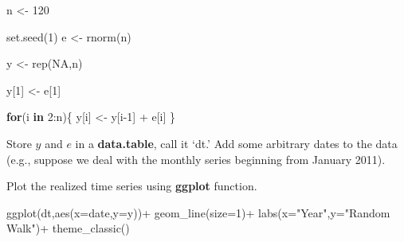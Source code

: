 \documentclass[
  12pt,
  oneside]{book}
\newenvironment{Shaded}{\begin{snugshade}}{\end{snugshade}}
\newcommand{\AttributeTok}[1]{\textcolor[rgb]{0.77,0.63,0.00}{#1}}
\newcommand{\ConstantTok}[1]{\textcolor[rgb]{0.00,0.00,0.00}{#1}}
\newcommand{\ControlFlowTok}[1]{\textcolor[rgb]{0.13,0.29,0.53}{\textbf{#1}}}
\newcommand{\DecValTok}[1]{\textcolor[rgb]{0.00,0.00,0.81}{#1}}
\newcommand{\FunctionTok}[1]{\textcolor[rgb]{0.00,0.00,0.00}{#1}}
\newcommand{\NormalTok}[1]{#1}
\newcommand{\OtherTok}[1]{\textcolor[rgb]{0.56,0.35,0.01}{#1}}
\newcommand{\SpecialCharTok}[1]{\textcolor[rgb]{0.00,0.00,0.00}{#1}}
\newcommand{\StringTok}[1]{\textcolor[rgb]{0.31,0.60,0.02}{#1}}
\begin{document}
\begin{Shaded}
\begin{Highlighting}[]
\NormalTok{n }\OtherTok{\textless{}{-}} \DecValTok{120}

\FunctionTok{set.seed}\NormalTok{(}\DecValTok{1}\NormalTok{)}
\NormalTok{e }\OtherTok{\textless{}{-}} \FunctionTok{rnorm}\NormalTok{(n)}

\NormalTok{y }\OtherTok{\textless{}{-}} \FunctionTok{rep}\NormalTok{(}\ConstantTok{NA}\NormalTok{,n)}

\NormalTok{y[}\DecValTok{1}\NormalTok{] }\OtherTok{\textless{}{-}}\NormalTok{ e[}\DecValTok{1}\NormalTok{]}

\ControlFlowTok{for}\NormalTok{(i }\ControlFlowTok{in} \DecValTok{2}\SpecialCharTok{:}\NormalTok{n)\{}
\NormalTok{  y[i] }\OtherTok{\textless{}{-}}\NormalTok{ y[i}\DecValTok{{-}1}\NormalTok{] }\SpecialCharTok{+}\NormalTok{ e[i]}
\NormalTok{\}}
\end{Highlighting}
\end{Shaded}

Store \(y\) and \(e\) in a \textbf{data.table}, call it `dt.' Add some arbitrary dates to the data (e.g., suppose we deal with the monthly series beginning from January 2011).

\begin{Shaded}
\end{Shaded}

Plot the realized time series using \textbf{ggplot} function.

\begin{Shaded}
\begin{Highlighting}[]
\FunctionTok{ggplot}\NormalTok{(dt,}\FunctionTok{aes}\NormalTok{(}\AttributeTok{x=}\NormalTok{date,}\AttributeTok{y=}\NormalTok{y))}\SpecialCharTok{+}
  \FunctionTok{geom\_line}\NormalTok{(}\AttributeTok{size=}\DecValTok{1}\NormalTok{)}\SpecialCharTok{+}
  \FunctionTok{labs}\NormalTok{(}\AttributeTok{x=}\StringTok{"Year"}\NormalTok{,}\AttributeTok{y=}\StringTok{"Random Walk"}\NormalTok{)}\SpecialCharTok{+}
  \FunctionTok{theme\_classic}\NormalTok{()}
\end{Highlighting}
\end{Shaded}
\end{document}
